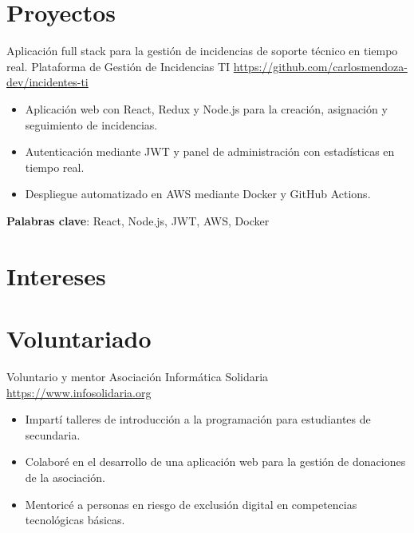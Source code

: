 \documentclass[a4paper, serif, 10pt]{moderncv}
\begin{document}
\section{Proyectos}

        {Aplicación full stack para la gestión de incidencias de soporte técnico en tiempo real.}
        {Plataforma de Gestión de Incidencias TI}
        {\url{https://github.com/carlosmendoza-dev/incidentes-ti}}
        {}
        {\begin{itemize}
\item Aplicación web con React, Redux y Node.js para la creación, asignación y seguimiento de incidencias.
\item Autenticación mediante JWT y panel de administración con estadísticas en tiempo real.
\item Despliegue automatizado en AWS mediante Docker y GitHub Actions.
\end{itemize}
\textbf{Palabras clave}: React, Node.js, JWT, AWS, Docker}
\section{Intereses}

\section{Voluntariado}

        {Voluntario y mentor}
        {Asociación Informática Solidaria}
        {\url{https://www.infosolidaria.org}}
        {}
        {\begin{itemize}
\item Impartí talleres de introducción a la programación para estudiantes de secundaria.
\item Colaboré en el desarrollo de una aplicación web para la gestión de donaciones de la asociación.
\item Mentoricé a personas en riesgo de exclusión digital en competencias tecnológicas básicas.
\end{itemize}}
\end{document}
